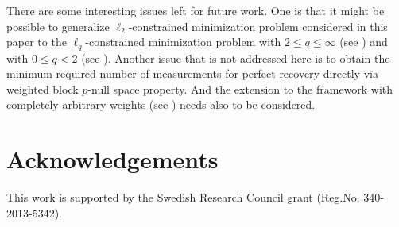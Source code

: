 \documentclass[11pt]{article}
\begin{document}
There are some interesting issues left for future work. One is that it might be possible to generalize $\ell_2$-constrained minimization problem considered in this paper to the $\ell_q$-constrained minimization problem with $2\leq q\leq \infty$ (see \cite{dlr,sac}) and with $0\leq q<2$ (see \cite{wllqy}). Another issue that is not addressed here is to obtain the minimum required number of measurements for perfect recovery directly via weighted block $p$-null space property. And the extension to the framework with completely arbitrary weights (see \cite{nsw}) needs also to be considered.

\section*{Acknowledgements}
 This work is supported by the Swedish Research Council grant (Reg.No. 340-2013-5342).
\end{document}
